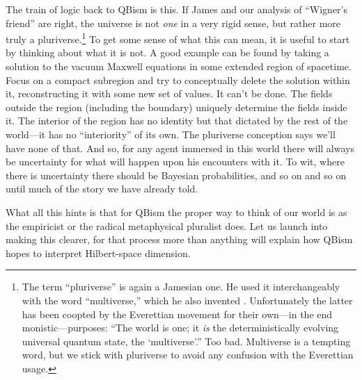 \documentclass[aps,pra,superscriptaddress,12pt,tightenlines,nofootinbib]{revtex4-2}
\begin{document}
The train of logic back to QBism is this.  If James and our analysis of ``Wigner's friend'' are right, the universe is not {\it one\/} in a very rigid sense, but rather more truly a pluriverse.\footnote{The term ``pluriverse'' is again a Jamesian one.  He used it interchangeably with the word ``multiverse,'' which he also invented \cite{JamesMultiverse}.  Unfortunately the latter has been coopted by the Everettian movement for their own---in the end monistic---purposes:  ``The world is one; it {\it is\/} the deterministically evolving universal quantum state, the `multiverse'.'' Too bad.  Multiverse is a tempting word, but we stick with pluriverse to avoid any confusion with the Everettian usage.}  To get some sense of what this can mean, it is useful to start by thinking about what it is not.  A good example can be found by taking a solution to the vacuum Maxwell equations in some extended region of spacetime.  Focus on a compact subregion and try to conceptually delete the solution within it, reconstructing it with some new set of values.  It can't be done.  The fields outside the region (including the boundary) uniquely determine the fields inside it.  The interior of the region has no identity but that dictated by the rest of the world---it has no ``interiority'' of its own.  The pluriverse conception says we'll have none of that.  And so, for any agent immersed in this world there will always be uncertainty for what will happen upon his encounters with it.  To wit, where there is uncertainty there should be Bayesian probabilities, and so on and so on until much of the story we have already told.

What all this hints is that for QBism the proper way to think of our world is as the empiricist or the radical metaphysical pluralist does.  Let us launch into making this clearer, for that process more than anything will explain how QBism hopes to interpret Hilbert-space dimension.
\end{document}
